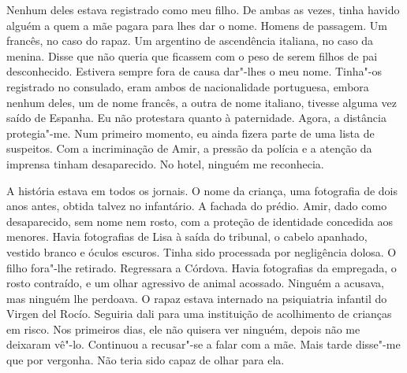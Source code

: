 Nenhum deles estava registrado como meu filho. De ambas as vezes, tinha
havido alguém a quem a mãe pagara para lhes dar o nome. Homens de
passagem. Um francês, no caso do rapaz. Um argentino de ascendência
italiana, no caso da menina. Disse que não queria que ficassem com o
peso de serem filhos de pai desconhecido. Estivera sempre fora de causa
dar"-lhes o meu nome. Tinha"-os registrado no consulado, eram ambos de
nacionalidade portuguesa, embora nenhum deles, um de nome francês, a
outra de nome italiano, tivesse alguma vez saído de Espanha. Eu não
protestara quanto à paternidade. Agora, a distância protegia"-me. Num
primeiro momento, eu ainda fizera parte de uma lista de suspeitos. Com a
incriminação de Amir, a pressão da polícia e a atenção da imprensa
tinham desaparecido. No hotel, ninguém me reconhecia.

A história estava em todos os jornais. O nome da criança, uma fotografia
de dois anos antes, obtida talvez no infantário. A fachada do prédio.
Amir, dado como desaparecido, sem nome nem rosto, com a proteção de
identidade concedida aos menores. Havia fotografias de Lisa à saída do
tribunal, o cabelo apanhado, vestido branco e óculos escuros. Tinha sido
processada por negligência dolosa. O filho fora"-lhe retirado.
Regressara a Córdova. Havia fotografias da empregada, o rosto contraído,
e um olhar agressivo de animal acossado. Ninguém a acusava, mas ninguém
lhe perdoava. O rapaz estava internado na psiquiatria infantil do Virgen
del Rocío. Seguiria dali para uma instituição de acolhimento de crianças
em risco. Nos primeiros dias, ele não quisera ver ninguém, depois não me
deixaram vê"-lo. Continuou a recusar"-se a falar com a mãe. Mais tarde
disse"-me que por vergonha. Não teria sido capaz de olhar para ela.

